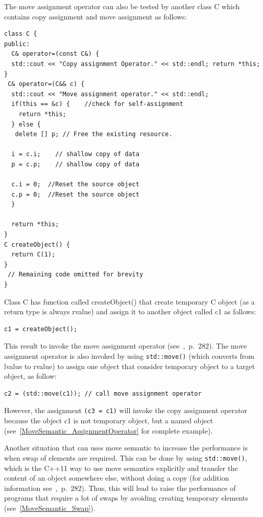 \documentclass[11pt]{report}
\begin{document}
The move assignment operator can also be tested by another class C which contains copy assignment and move assignment as follows:
\begin{lstlisting}
class C {
public:
  C& operator=(const C&) { 
  std::cout << "Copy assignment Operator." << std::endl; return *this; 
}
 C& operator=(C&& c) {
  std::cout << "Move assignment operator." << std::endl;
  if(this == &c) {    //check for self-assignment
    return *this;
  } else {
   delete [] p; // Free the existing resource.

  i = c.i;    // shallow copy of data
  p = c.p;    // shallow copy of data

  c.i = 0;  //Reset the source object
  c.p = 0;  //Reset the source object
  }
  
  return *this; 
}
C createObject() {
  return C(1);
}
 // Remaining code omitted for brevity
}
\end{lstlisting}
Class C has function called createObject() that create temporary C object (as a return type is always rvalue) and assign it to another object called c1 as follows:
\begin{lstlisting}
c1 = createObject();
\end{lstlisting}
This result to invoke the move assignment operator (see~\cite{Gregorie:professionalcpp},~p.~282). The move assignment operator is also invoked by using \texttt{std::move()} (which converts from lvalue to rvalue) to assign one object that consider temporary object to a target object, as follow:
\begin{lstlisting}
c2 = (std::move(c1)); // call move assignment operator
\end{lstlisting}
However, the assignment \texttt{(c3 = c1)} will invoke the copy assignment operator because the object c1 is not temporary object, but a named object (see~\ref{MoveSemantic_AssignmentOperator} for complete example).

Another situation that can uses move semantic to increase the performance is when swap of elements are required. This can be done by using \texttt{std::move()}, which is the C++11 way to use move semantics explicitly and transfer the content of an object somewhere else, without doing a copy (for addition information see~\cite{Gregorie:professionalcpp},~p.~282). Thus, this will lead to raise the performance of programs that require a lot of swaps by avoiding creating temporary elements (see~\ref{MoveSemantic_Swap}).

\end{document}
